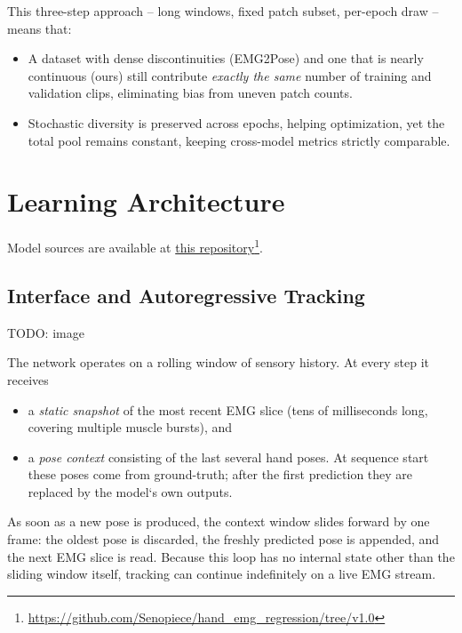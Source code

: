 This three-step approach -- long windows, fixed patch subset, per-epoch draw -- means
that:

\begin{itemize}
  \item A dataset with dense discontinuities (EMG2Pose) and one that is
        nearly continuous (ours) still contribute \emph{exactly the same}
        number of training and validation clips, eliminating bias from
        uneven patch counts.
  \item Stochastic diversity is preserved across epochs, helping optimization,
        yet the total pool remains constant, keeping cross-model metrics
        strictly comparable.
\end{itemize}

\section{Learning Architecture}

Model sources are available at \href{https://github.com/Senopiece/hand_emg_regression/tree/v1.0}{this repository}\footnote{\url{https://github.com/Senopiece/hand_emg_regression/tree/v1.0}}.

\subsection{Interface and Autoregressive Tracking}

TODO: image

The network operates on a rolling window of sensory history.
At every step it receives

\begin{itemize}
  \item a \emph{static snapshot} of the most recent EMG slice
        (tens of milliseconds long, covering multiple muscle bursts), and
  \item a \emph{pose context} consisting of the last several hand poses.
        At sequence start these poses come from ground-truth; after the first
        prediction they are replaced by the model`s own outputs.
\end{itemize}

As soon as a new pose is produced, the context window slides forward by one
frame: the oldest pose is discarded, the freshly predicted pose is appended,
and the next EMG slice is read.
Because this loop has no internal state other than the sliding window itself,
tracking can continue indefinitely on a live EMG stream.

